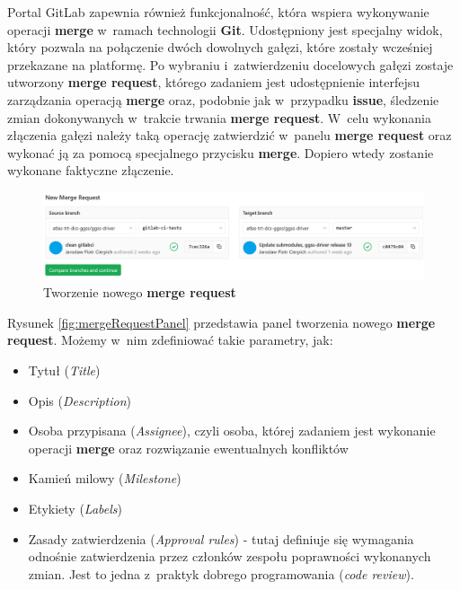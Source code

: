 Portal GitLab zapewnia również funkcjonalność, która wspiera wykonywanie operacji \textbf{merge} w~ramach technologii \textbf{Git}. Udostępniony jest specjalny widok, który pozwala na połączenie dwóch dowolnych gałęzi, które zostały wcześniej przekazane na platformę. Po wybraniu i~zatwierdzeniu docelowych gałęzi zostaje utworzony \textbf{merge request}, którego zadaniem jest udostępnienie interfejsu zarządzania operacją \textbf{merge} oraz, podobnie jak w~przypadku \textbf{issue}, śledzenie zmian dokonywanych w~trakcie trwania \textbf{merge request}. W~celu wykonania złączenia gałęzi należy taką operację zatwierdzić w~panelu \textbf{merge request} oraz wykonać ją za pomocą specjalnego przycisku \textbf{merge}. Dopiero wtedy zostanie wykonane faktyczne złączenie.\par

\begin{figure}[H]
\centering
\includegraphics[width=\textwidth]{res/png/newMergeRequest}
\caption{Tworzenie nowego \textbf{merge request}}
\end{figure}

Rysunek \ref{fig:mergeRequestPanel} przedstawia panel tworzenia nowego \textbf{merge request}. Możemy w~nim zdefiniować takie parametry, jak:
\begin{itemize}
\item Tytuł (\textit{Title})
\item Opis (\textit{Description})
\item Osoba przypisana (\textit{Assignee}), czyli osoba, której zadaniem jest wykonanie operacji \textbf{merge} oraz rozwiązanie ewentualnych konfliktów
\item Kamień milowy (\textit{Milestone})
\item Etykiety (\textit{Labels})
\item Zasady zatwierdzenia (\textit{Approval rules}) - tutaj definiuje się wymagania odnośnie zatwierdzenia przez członków zespołu poprawności wykonanych zmian. Jest to jedna z~praktyk dobrego programowania (\textit{code review}).
\end{itemize}


